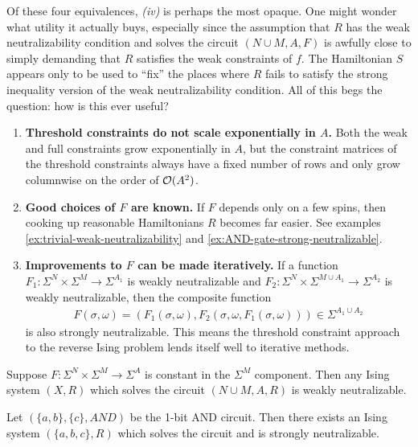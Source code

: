 \documentclass{article}
\begin{document}
\begin{rmk}
  Of these four equivalences, \emph{(iv)} is perhaps the most opaque. One might wonder what utility it actually buys, especially since the assumption that $R$ has the weak neutralizability condition and solves the circuit $(N\cup M, A, F)$ is awfully close to simply demanding that $R$ satisfies the weak constraints of $f$. The Hamiltonian $S$ appears only to be used to ``fix'' the places where $R$ fails to satisfy the strong inequality version of the weak neutralizability condition. All of this begs the question: how is this ever useful?

  \begin{enumerate}
    \item \textbf{Threshold constraints do not scale exponentially in $A$.} Both the weak and full constraints grow exponentially in $A$, but the constraint matrices of the threshold constraints always have a fixed number of rows and only grow columnwise on the order of $\mathcal{O}(A^2)$.
    \item \textbf{Good choices of $F$ are known.} If $F$ depends only on a few spins, then cooking up reasonable Hamiltonians $R$ becomes far easier. See examples \ref{ex:trivial-weak-neutralizability} and \ref{ex:AND-gate-strong-neutralizable}.
    \item \textbf{Improvements to $F$ can be made iteratively.} If a function $F_1:\Sigma^N \times \Sigma^M \to \Sigma^{A_1}$ is weakly neutralizable and $F_2:\Sigma^N\times \Sigma^{M\cup A_1} \to \Sigma^{A_2}$ is weakly neutralizable, then the composite function
      \begin{align*}
        F(\sigma, \omega) = (F_1(\sigma, \omega), F_2(\sigma, \omega, F_1(\sigma, \omega))) \in \Sigma^{A_1 \cup A_2}
      \end{align*}
      is also strongly neutralizable. This means the threshold constraint approach to the reverse Ising problem lends itself well to iterative methods.
  \end{enumerate}
\end{rmk}

\begin{example}\label{ex:trivial-weak-neutralizability}
  Suppose $F:\Sigma^N \times \Sigma^M \to \Sigma^A$ is constant in the $\Sigma^M$ component. Then any Ising system $(X, R)$ which solves the circuit $(N\cup M, A, R)$ is weakly neutralizable.
\end{example}
\begin{example}\label{ex:AND-gate-strong-neutralizable}
  Let $(\{a,b\}, \{c\}, AND)$ be the 1-bit AND circuit. Then there exists an Ising system $(\{a,b,c\}, R)$ which solves the circuit and is strongly neutralizable.
\end{example}
\end{document}
